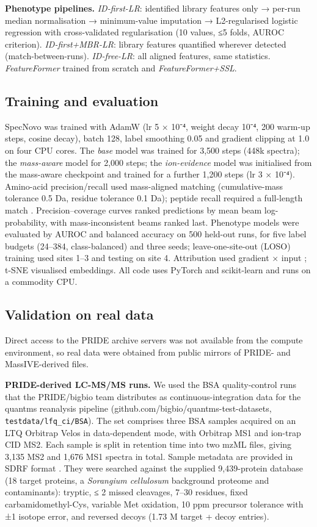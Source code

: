 \documentclass{sn-preview}
\begin{document}
\textbf{Phenotype pipelines.} \emph{ID-first-LR}: identified library features only → per-run median normalisation → minimum-value imputation → L2-regularised logistic regression with cross-validated regularisation (10 values, ≤5 folds, AUROC criterion). \emph{ID-first+MBR-LR}: library features quantified wherever detected (match-between-runs). \emph{ID-free-LR}: all aligned features, same statistics. \emph{FeatureFormer} trained from scratch and \emph{FeatureFormer+SSL}.

\subsection{Training and evaluation}

SpecNovo was trained with AdamW (lr 5 × 10⁻⁴, weight decay 10⁻⁴, 200 warm-up steps, cosine decay), batch 128, label smoothing 0.05 and gradient clipping at 1.0 on four CPU cores. The \emph{base} model was trained for 3,500 steps (448k spectra); the \emph{mass-aware} model for 2,000 steps; the \emph{ion-evidence} model was initialised from the mass-aware checkpoint and trained for a further 1,200 steps (lr 3 × 10⁻⁴). Amino-acid precision/recall used mass-aligned matching (cumulative-mass tolerance 0.5 Da, residue tolerance 0.1 Da); peptide recall required a full-length match \cite{yilmaz2024,tran2017}. Precision--coverage curves ranked predictions by mean beam log-probability, with mass-inconsistent beams ranked last. Phenotype models were evaluated by AUROC and balanced accuracy on 500 held-out runs, for five label budgets (24--384, class-balanced) and three seeds; leave-one-site-out (LOSO) training used sites 1--3 and testing on site 4. Attribution used gradient × input \cite{shrikumar2017}; t-SNE \cite{maaten2008} visualised embeddings. All code uses PyTorch \cite{paszke2019} and scikit-learn \cite{pedregosa2011} and runs on a commodity CPU.

\subsection{Validation on real data}

Direct access to the PRIDE archive servers was not available from the compute environment, so real data were obtained from public mirrors of PRIDE- and MassIVE-derived files.

\textbf{PRIDE-derived LC-MS/MS runs.} We used the BSA quality-control runs that the PRIDE/bigbio team distributes as continuous-integration data for the quantms reanalysis pipeline \cite{dai2024} (github.com/bigbio/quantms-test-datasets, \texttt{testdata/lfq\_ci/BSA}). The set comprises three BSA samples acquired on an LTQ Orbitrap Velos in data-dependent mode, with Orbitrap MS1 and ion-trap CID MS2. Each sample is split in retention time into two mzML files, giving 3,135 MS2 and 1,676 MS1 spectra in total. Sample metadata are provided in SDRF format \cite{dai2021}. They were searched against the supplied 9,439-protein database (18 target proteins, a \emph{Sorangium cellulosum} background proteome and contaminants): tryptic, ≤ 2 missed cleavages, 7--30 residues, fixed carbamidomethyl-Cys, variable Met oxidation, 10 ppm precursor tolerance with ±1 isotope error, and reversed decoys (1.73 M target + decoy entries).
\end{document}
